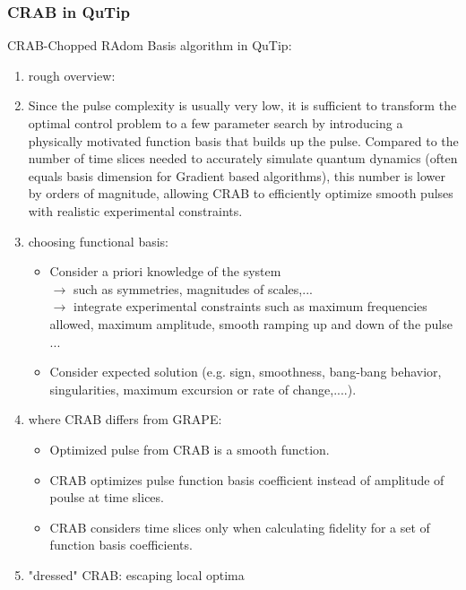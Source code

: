 \documentclass{article}
\begin{document}
\subsubsection{CRAB in QuTip}
CRAB-Chopped RAdom Basis algorithm in QuTip: 
\begin{enumerate}
    \item rough overview: 
    \item Since the pulse complexity is usually very low, it is sufficient to transform the optimal control problem to a few parameter search by introducing a physically motivated function basis that builds up the pulse. 
        Compared to the number of time slices needed to accurately simulate quantum dynamics (often equals basis dimension for Gradient based algorithms), this number is lower by orders of magnitude, 
        allowing CRAB to efficiently optimize smooth pulses with realistic experimental constraints. 
    \item choosing functional basis: 
        \begin{itemize}
            \item Consider a priori knowledge of the system \\
                $\rightarrow$ such as symmetries, magnitudes of scales,... \\
                $\rightarrow$ integrate experimental constraints such as maximum frequencies allowed, maximum amplitude, smooth ramping up and down of the pulse ...
            \item Consider expected solution (e.g. sign, smoothness, bang-bang behavior, singularities, maximum excursion or rate of change,....).
        \end{itemize}
    \item where CRAB differs from GRAPE: 
        \begin{itemize}
            \item Optimized pulse from CRAB is a smooth function.
            \item CRAB optimizes pulse function basis coefficient instead of amplitude of poulse at time slices.
            \item CRAB considers time slices only when calculating fidelity for a set of function basis coefficients. 
        \end{itemize}
    \item "dressed" CRAB: escaping local optima
\end{enumerate}
\end{document}
